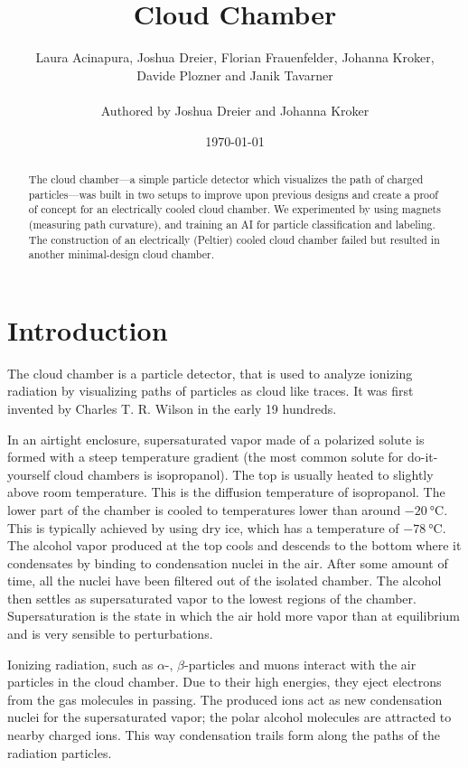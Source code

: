 \documentclass[10pt,a4paper]{article}
\title{Cloud Chamber}
\author{Laura Acinapura, Joshua Dreier, Florian Frauenfelder, Johanna Kroker, \\ Davide Plozner and Janik Tavarner \\ ~ \\ Authored by Joshua Dreier and Johanna Kroker}
\date{\today}
\newcommand{\shorttitle}{Cloud Chamber}
\newcommand{\shortauthors}{Dreier, Kroker}
\begin{document}
\maketitle

\begin{abstract}
The cloud chamber---a simple particle detector which visualizes the path of charged particles---was built in two setups to improve upon previous designs and create a proof of concept for an electrically cooled cloud chamber. We experimented by using magnets (measuring path curvature), and training an AI for particle classification and labeling. The construction of an electrically (Peltier) cooled cloud chamber failed but resulted in another minimal-design cloud chamber.  
\end{abstract}



\pagestyle{fancy}
\fancyhead[LO]{\shorttitle}
\fancyhead[CO]{\monthyeardate\today}
\fancyhead[RO]{\shortauthors}

\section{Introduction}
The cloud chamber is a particle detector, that is used to analyze ionizing radiation by visualizing paths of particles as cloud like traces. It was first invented by Charles T. R. Wilson in the early 19 hundreds.

In an airtight enclosure, supersaturated vapor made of a polarized  solute is formed with a steep temperature gradient (the most common solute for do-it-yourself cloud chambers is isopropanol). The top is usually heated to slightly above room temperature. This is the diffusion temperature of isopropanol. The lower part of the chamber is cooled to temperatures lower than around $\qty{-20}{\celsius}$. This is typically achieved by using dry ice, which has a temperature of $\qty{-78}{\celsius}$. The alcohol vapor produced at the top cools and descends to the bottom where it condensates by binding to condensation nuclei in the air. After some amount of time, all the nuclei have been filtered out of the isolated chamber. The alcohol then settles as supersaturated vapor to the lowest regions of the chamber. Supersaturation is the state in which the air hold more vapor than at equilibrium and is very sensible to perturbations.

Ionizing radiation, such as $\alpha$-, $\beta$-particles and muons interact with the air particles in the cloud chamber. Due to their high energies, they eject electrons from the gas molecules in passing. The produced ions act as new condensation nuclei for the supersaturated vapor; the polar alcohol molecules are attracted to nearby charged ions. This way condensation trails form along the paths of the radiation particles.
\end{document}
